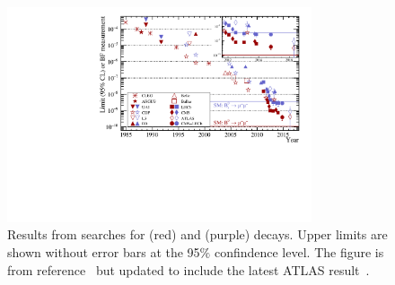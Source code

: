 \begin{figure}[htbp]
    \centering
        \includegraphics[width=0.8\textwidth]{./Figs/Introduction/95_CL.pdf}
    \caption{Results from searches for \bdmumu (red) and \bsmumu (purple) decays. Upper limits are shown without error bars at the 95$\%$ confindence level. The figure is from reference~\cite{CMS:2014xfa} but updated to include the latest ATLAS result~\cite{Aaboud:2016ire}.}
    \label{fig:bmumu_history}
\end{figure}

